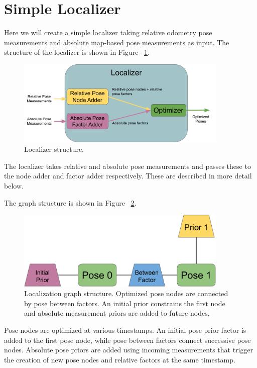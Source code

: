 \section{Simple Localizer}\label{sec:simple_localizer}
Here we will create a simple localizer taking relative odometry pose measurements and absolute map-based pose measurements as input.
The structure of the localizer is shown in Figure ~\ref{img:simple_localizer}.

\begin{figure}[ht]
    \centering
\includegraphics[width=0.9\textwidth]{simple_localizer.pdf}
 \caption{Localizer structure.}
  \label{img:simple_localizer}
\end{figure}
The localizer takes relative and absolute pose measurements and passes these to the node adder and factor adder respectively. 
These are described in more detail below. \par

The graph structure is shown in Figure ~\ref{img:loc_graph}.

\begin{figure}[ht]
    \centering
\includegraphics[width=0.9\textwidth]{loc_graph.pdf}
 \caption{Localization graph structure. Optimized pose nodes are connected by pose between factors. An initial prior constrains the first node and absolute measurement priors are added to future nodes.}
  \label{img:loc_graph}
\end{figure}

Pose nodes are optimized at various timestamps. 
An initial pose prior factor is added to the first pose node, while pose between factors connect successive pose nodes.
Absolute pose priors are added using incoming measurements that trigger the creation of new pose nodes and relative factors at the same timestamp.

